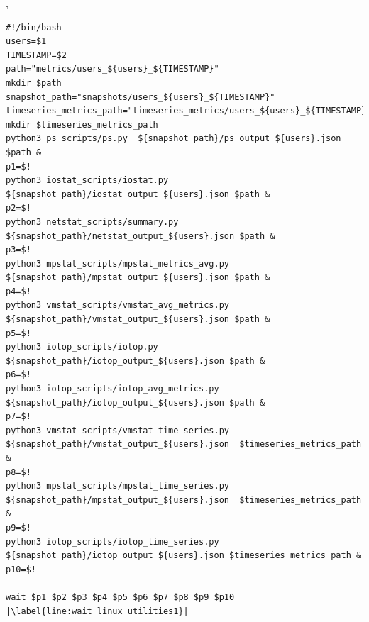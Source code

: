 \documentclass{iitbreport}
\begin{document}
\lstset{language=bash}
\lstset{frame=lines}
\lstset{breaklines=true}
\lstset{numbers=left,
    stepnumber=1}
    
,

\begin{lstlisting}[escapechar=|]
#!/bin/bash
users=$1
TIMESTAMP=$2
path="metrics/users_${users}_${TIMESTAMP}"
mkdir $path
snapshot_path="snapshots/users_${users}_${TIMESTAMP}"
timeseries_metrics_path="timeseries_metrics/users_${users}_${TIMESTAMP}"
mkdir $timeseries_metrics_path
python3 ps_scripts/ps.py  ${snapshot_path}/ps_output_${users}.json $path &
p1=$!
python3 iostat_scripts/iostat.py ${snapshot_path}/iostat_output_${users}.json $path &
p2=$!
python3 netstat_scripts/summary.py ${snapshot_path}/netstat_output_${users}.json $path &
p3=$!
python3 mpstat_scripts/mpstat_metrics_avg.py ${snapshot_path}/mpstat_output_${users}.json $path &
p4=$!
python3 vmstat_scripts/vmstat_avg_metrics.py ${snapshot_path}/vmstat_output_${users}.json $path &
p5=$!
python3 iotop_scripts/iotop.py ${snapshot_path}/iotop_output_${users}.json $path &
p6=$!
python3 iotop_scripts/iotop_avg_metrics.py ${snapshot_path}/iotop_output_${users}.json $path &
p7=$!
python3 vmstat_scripts/vmstat_time_series.py ${snapshot_path}/vmstat_output_${users}.json  $timeseries_metrics_path &
p8=$!
python3 mpstat_scripts/mpstat_time_series.py ${snapshot_path}/mpstat_output_${users}.json  $timeseries_metrics_path &
p9=$!
python3 iotop_scripts/iotop_time_series.py ${snapshot_path}/iotop_output_${users}.json $timeseries_metrics_path &
p10=$!

wait $p1 $p2 $p3 $p4 $p5 $p6 $p7 $p8 $p9 $p10 |\label{line:wait_linux_utilities1}|
\end{lstlisting}


\printbibliography
{}
\end{document}

